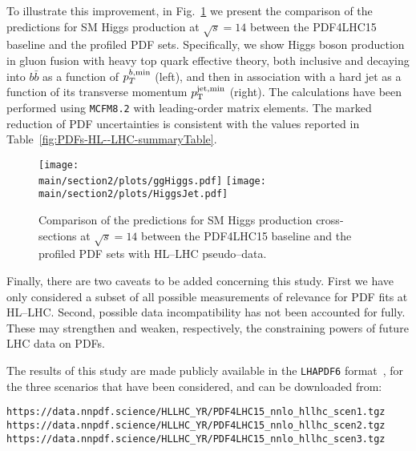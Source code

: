 To illustrate this improvement, in Fig.~\ref{fig:MCFMxsects}
we present the comparison of the predictions for 
    SM Higgs production at $\sqrt{s}=14$ \UTeV between the PDF4LHC15
    baseline and the profiled PDF sets.
    Specifically, we show
     Higgs boson production in gluon fusion with heavy top
      quark effective theory, both inclusive
      and decaying into $b\bar{b}$ as a function of $p_T^{b,\rm min}$ (left), and
      then in association with a hard jet as a function of its transverse
      momentum $p_{\rm T}^{\rm jet, min}$ (right).
      The calculations have been performed using {\tt MCFM8.2} with leading-order
      matrix elements.
      The marked reduction of PDF uncertainties is consistent with
      the values reported in Table~\ref{fig:PDFs-HL--LHC-summaryTable}.
     

\begin{figure}[t]
  \begin{center}
    \texttt{[image: \\main/section2/plots/ggHiggs.pdf]}
    \texttt{[image: \\main/section2/plots/HiggsJet.pdf]}
    \caption{\small Comparison of the predictions for 
    SM Higgs production cross-sections at $\sqrt{s}=14$ \UTeV between the PDF4LHC15
baseline and the profiled PDF sets with HL--LHC pseudo--data.
     \label{fig:MCFMxsects} }
  \end{center}
\end{figure}
 
      Finally, there are two caveats to be added concerning this study.
      First we have only considered a subset of all possible measurements of relevance for PDF fits at HL--LHC.
      Second, possible data incompatibility has not been
      accounted for fully. These may strengthen and weaken, respectively, the constraining powers of future LHC data on PDFs.
      
The results of this study are made
 publicly available in the {\tt LHAPDF6} format~\cite{Buckley:2014ana},
 for the three
 scenarios that have been considered, and can be
 downloaded from:
 \begin{center}
{\tt  https://data.nnpdf.science/HLLHC\_YR/PDF4LHC15\_nnlo\_hllhc\_scen1.tgz}\\
{\tt https://data.nnpdf.science/HLLHC\_YR/PDF4LHC15\_nnlo\_hllhc\_scen2.tgz}\\
{\tt https://data.nnpdf.science/HLLHC\_YR/PDF4LHC15\_nnlo\_hllhc\_scen3.tgz}
\end{center}


